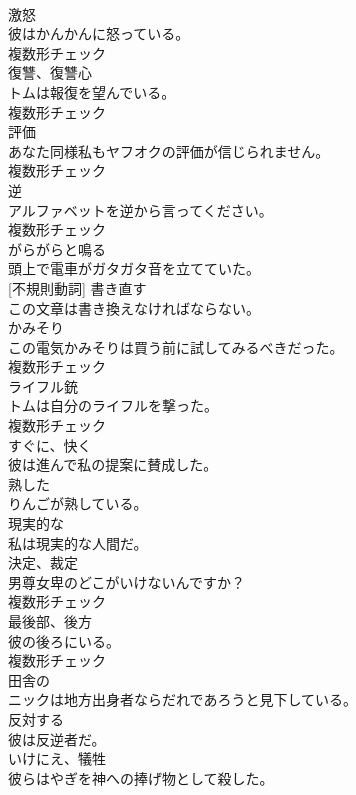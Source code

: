 \documentclass[8pt]{extreport}
\begin{document}
\begin{CJK}{UTF8}{min}
\\	[名詞]	激怒	
\\	彼はかんかんに怒っている。	
\\	複数形チェック
\\	[名詞]	復讐、復讐心	
\\	トムは報復を望んでいる。	
\\	複数形チェック
\\	[名詞]	評価	
\\	あなた同様私もヤフオクの評価が信じられません。	
\\	複数形チェック
\\	[名詞]	逆	
\\	アルファベットを逆から言ってください。	
\\	複数形チェック
\\	[動詞]	がらがらと鳴る	
\\	頭上で電車がガタガタ音を立てていた。	
\\	[動詞] [不規則動詞]	書き直す	
\\	この文章は書き換えなければならない。	
\\	[名詞]	かみそり	
\\	この電気かみそりは買う前に試してみるべきだった。	
\\	複数形チェック
\\	[名詞]	ライフル銃	
\\	トムは自分のライフルを撃った。	
\\	複数形チェック
\\	[副詞]	すぐに、快く	
\\	彼は進んで私の提案に賛成した。	
\\	[形容詞]	熟した	
\\	りんごが熟している。	
\\	[形容詞]	現実的な	
\\	私は現実的な人間だ。	
\\	[名詞]	決定、裁定	
\\	男尊女卑のどこがいけないんですか？	
\\	複数形チェック
\\	[名詞]	最後部、後方	
\\	彼の後ろにいる。	
\\	複数形チェック
\\	[形容詞]	田舎の	
\\	ニックは地方出身者ならだれであろうと見下している。	
\\	[動詞]	反対する	
\\	彼は反逆者だ。	
\\	[名詞]	いけにえ、犠牲	
\\	彼らはやぎを神への捧げ物として殺した。	

\end{CJK}
\end{document}
